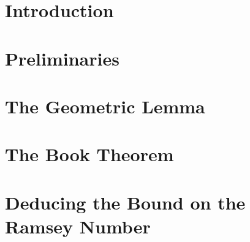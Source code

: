 \section{Introduction}


\section{Preliminaries}


\section{The Geometric Lemma}


\section{The Book Theorem}


\section{Deducing the Bound on the Ramsey Number}

